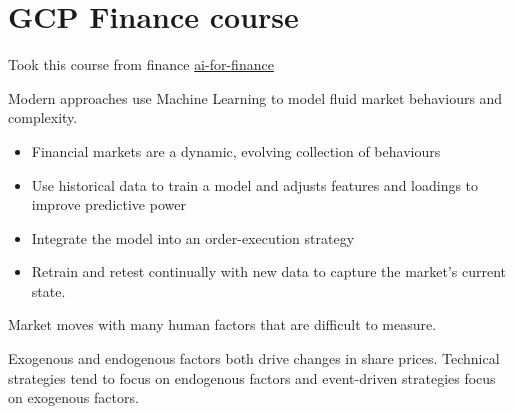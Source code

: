 

\section{GCP Finance course}

Took this course from finance
\href{https://github.com/GoogleCloudPlatform/training-data-analyst/tree/master/courses/ai-for-finance}{ai-for-finance}


Modern approaches use Machine Learning
to model fluid market behaviours and complexity.

\begin{itemize}
\item Financial markets are a dynamic, evolving collection of behaviours
\item Use historical data to train a model and adjusts
features and loadings to improve predictive power
\item Integrate the model into an order-execution strategy
\item Retrain and retest continually with new data
to capture the market's current state.
\end{itemize}


Market moves with many human factors that are difficult to measure.

Exogenous and endogenous factors both drive
changes in share prices. Technical strategies tend
to focus on endogenous factors and event-driven
strategies focus on exogenous factors.

